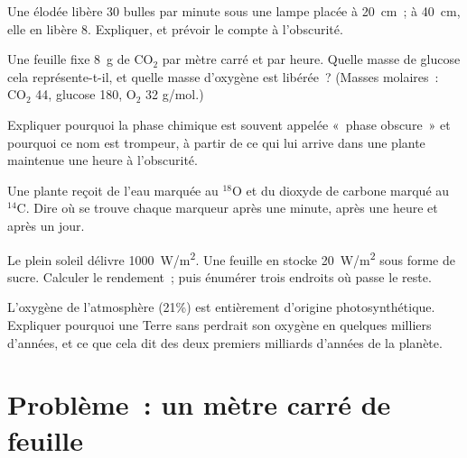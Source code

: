 \begin{exercise}[$\star\star$]\label{exo:g12:photosynthesis:10}
Une élodée libère 30 bulles par minute sous une lampe placée à
\qty{20}{cm}~; à \qty{40}{cm}, elle en libère 8. Expliquer, et prévoir
le compte à l'obscurité.
\end{exercise}

\begin{exercise}[$\star\star$]\label{exo:g12:photosynthesis:11}
Une feuille fixe \qty{8}{g} de $\mathrm{CO_2}$ par mètre carré et par
heure. Quelle masse de glucose cela représente-t-il, et quelle masse
d'oxygène est libérée~? (Masses molaires~: $\mathrm{CO_2}$ 44, glucose
180, $\mathrm{O_2}$ 32 \unit{g/mol}.)
\end{exercise}

\begin{exercise}[$\star\star\star$]\label{exo:g12:photosynthesis:12}
Expliquer pourquoi la phase chimique est souvent appelée «~phase
obscure~» et pourquoi ce nom est trompeur, à partir de ce qui lui
arrive dans une plante maintenue une heure à l'obscurité.
\end{exercise}

\begin{exercise}[$\star\star\star$]\label{exo:g12:photosynthesis:13}
Une plante reçoit de l'eau marquée au $^{18}$O et du dioxyde de
carbone marqué au $^{14}$C. Dire où se trouve chaque marqueur après
une minute, après une heure et après un jour.
\end{exercise}

\begin{exercise}[$\star\star\star$]\label{exo:g12:photosynthesis:14}
Le plein soleil délivre \qty{1000}{W/m^2}. Une feuille en stocke
\qty{20}{W/m^2} sous forme de sucre. Calculer le rendement~; puis
énumérer trois endroits où passe le reste.
\end{exercise}

\begin{exercise}[$\star\star\star$]\label{exo:g12:photosynthesis:15}
L'oxygène de l'atmosphère (21\%) est entièrement d'origine
photosynthétique. Expliquer pourquoi une Terre sans 
perdrait son oxygène en quelques milliers d'années, et ce que cela dit
des deux premiers milliards d'années de la planète.
\end{exercise}

\section{Problème~: un mètre carré de feuille}

